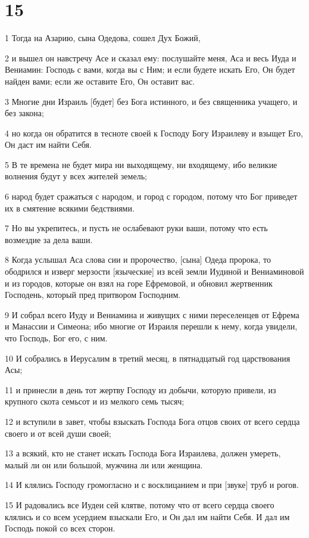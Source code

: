 \chapter{15}

\par 1 Тогда на Азарию, сына Одедова, сошел Дух Божий,
\par 2 и вышел он навстречу Асе и сказал ему: послушайте меня, Аса и весь Иуда и Вениамин: Господь с вами, когда вы с Ним; и если будете искать Его, Он будет найден вами; если же оставите Его, Он оставит вас.
\par 3 Многие дни Израиль [будет] без Бога истинного, и без священника учащего, и без закона;
\par 4 но когда он обратится в тесноте своей к Господу Богу Израилеву и взыщет Его, Он даст им найти Себя.
\par 5 В те времена не будет мира ни выходящему, ни входящему, ибо великие волнения будут у всех жителей земель;
\par 6 народ будет сражаться с народом, и город с городом, потому что Бог приведет их в смятение всякими бедствиями.
\par 7 Но вы укрепитесь, и пусть не ослабевают руки ваши, потому что есть возмездие за дела ваши.
\par 8 Когда услышал Аса слова сии и пророчество, [сына] Одеда пророка, то ободрился и изверг мерзости [языческие] из всей земли Иудиной и Вениаминовой и из городов, которые он взял на горе Ефремовой, и обновил жертвенник Господень, который пред притвором Господним.
\par 9 И собрал всего Иуду и Вениамина и живущих с ними переселенцев от Ефрема и Манассии и Симеона; ибо многие от Израиля перешли к нему, когда увидели, что Господь, Бог его, с ним.
\par 10 И собрались в Иерусалим в третий месяц, в пятнадцатый год царствования Асы;
\par 11 и принесли в день тот жертву Господу из добычи, которую привели, из крупного скота семьсот и из мелкого семь тысяч;
\par 12 и вступили в завет, чтобы взыскать Господа Бога отцов своих от всего сердца своего и от всей души своей;
\par 13 а всякий, кто не станет искать Господа Бога Израилева, должен умереть, малый ли он или большой, мужчина ли или женщина.
\par 14 И клялись Господу громогласно и с восклицанием и при [звуке] труб и рогов.
\par 15 И радовались все Иудеи сей клятве, потому что от всего сердца своего клялись и со всем усердием взыскали Его, и Он дал им найти Себя. И дал им Господь покой со всех сторон.
